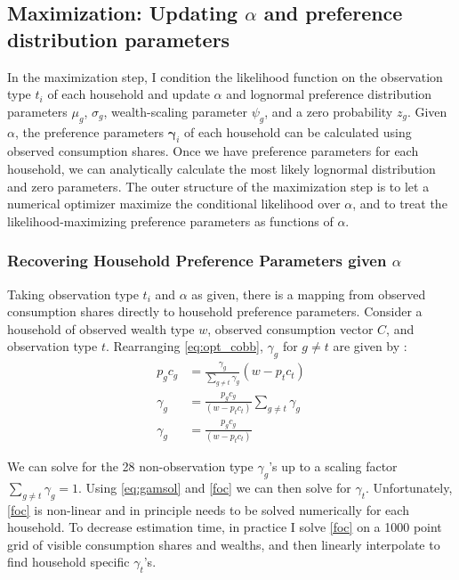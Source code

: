 \subsection{Maximization: Updating $\alpha$ and preference distribution parameters} 

In the maximization step, I condition the likelihood function on the observation type $t_i$ of each household and update $\alpha$ and lognormal preference distribution parameters $\mu_g$, $\sigma_g$, wealth-scaling parameter $\psi_g$, and a zero probability $z_g$.  Given $\alpha$, the preference parameters $\mathbf{\gamma}_i$ of each household can be calculated using observed consumption shares.  Once we have preference parameters for each household, we can analytically calculate the most likely lognormal distribution and zero parameters.  The outer structure of the maximization step is to let a numerical optimizer maximize the conditional likelihood over $\alpha$, and to treat the likelihood-maximizing preference parameters as functions of $\alpha$.

\subsubsection{Recovering Household Preference Parameters given $\alpha$}
\label{sec:upd_prefs}

Taking observation type $t_i$ and $\alpha$ as given, there is a mapping from observed consumption shares directly to household preference parameters.  Consider a household of observed wealth type $w$, observed consumption vector $C$, and observation type $t$.  Rearranging \eqref{eq:opt_cobb}, $\gamma_g$ for $g\neq t$ are given by :
\begin{align}
	\label{eq:sgd}
	p_gc_g &= \frac{\gamma_g}{\sum_{g\neq t}\gamma_g}  \left(w-  p_t c_t\right)\\
	\label{eq:sgdsol}
	\gamma_g &= \frac{p_g c_g}{\left(w- p_t c_t\right)} \sum_{g\neq t}\gamma_g\\
	\label{eq:gamsol}
	\gamma_g &= \frac{p_g c_g}{\left(w- p_t c_t\right)} 
\end{align}

We can solve for the 28 non-observation type $\gamma_g$'s up to a scaling factor $\sum_{g\neq t}\gamma_g = 1$.  Using \eqref{eq:gamsol} and \eqref{foc} we can then solve for $\gamma_t$.  Unfortunately, \eqref{foc} is non-linear and in principle needs to be solved numerically for each household.  To decrease estimation time, in practice I solve \eqref{foc} on a 1000 point grid of visible consumption shares and wealths, and then linearly interpolate to find household specific $\gamma_t$'s.

